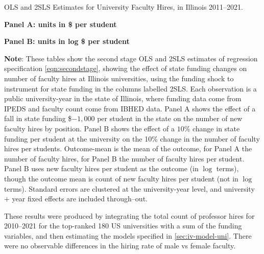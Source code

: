 \begin{table}[h!]
    \singlespacing
    \centering
    \caption{OLS and 2SLS Estimates for University Faculty Hires, in Illinois 2011--2021.}

    \textbf{Panel A: units in \$ per student}

    \makebox[\textwidth][c]{}
    
    \textbf{Panel B: units in log \$ per student}
    
    \makebox[\textwidth][c]{}
    \label{tab:facultyhires-illinois-reg}
    \justify
    \footnotesize
    \textbf{Note}:
    These tables show the second stage OLS and 2SLS estimates of regression specification \eqref{eqn:secondstage}, showing the effect of state funding changes on number of faculty hires at Illinois universities, using the funding shock to instrument for state funding in the columns labelled 2SLS.
    Each observation is a public university-year in the state of Illinois, where funding data come from IPEDS and faculty count come from IBHED data.
    Panel A shows the effect of a fall in state funding \$$-1,000$ per student in the state on the number of new faculty hires by position.
    Panel B shows the effect of a $10$\% change in state funding per student at the university on the 10\% change in the number of faculty hires per students.
    Outcome-mean is the mean of the outcome, for Panel A the number of faculty hires, for Panel B the number of faculty hires per student.
    Panel B uses new faculty hires per student as the outcome (in $\log$ terms), though the outcome mean is count of new faculty hires per student (not in $\log$ terms).
    Standard errors are clustered at the university-year level, and university $+$ year fixed effects are included through--out.
\end{table}

These results were produced by integrating the total count of professor hires for 2010--2021 for the top-ranked 180 US universities with a sum of the funding variables, and then estimating the models specified in \autoref{sec:iv-model-uni}.
There were no observable differences in the hiring rate of male vs female faculty.

